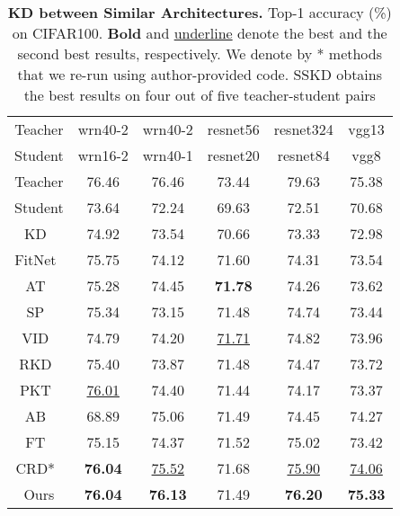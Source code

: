 \documentclass[runningheads]{llncs}
\begin{document}
\begin{table}[t]
    \begin{minipage}{0.30\textwidth}
    \caption{\textbf{KD between Similar Architectures.} Top-1 accuracy (\%) on CIFAR100. \textbf{Bold} and \underline{underline} denote the best and the second best results, respectively. We denote by * methods that we re-run using author-provided code. SSKD obtains the best results on four out of five teacher-student pairs}
    \label{tb1}
    \end{minipage} \hspace{0.01\textwidth}
\begin{minipage}{0.67\textwidth} 
	\begin{tabular}{cccccc}
		\toprule
		Teacher & wrn40-2 & wrn40-2 & resnet56 & resnet324 & vgg13 \\
		Student & wrn16-2 & wrn40-1 & resnet20 & resnet84 & vgg8 \\
		\midrule
		Teacher & 76.46 & 76.46 & 73.44 & 79.63 & 75.38 \\
		Student & 73.64 & 72.24 & 69.63 & 72.51 & 70.68 \\
		\midrule
		KD~\cite{KD} & 74.92 & 73.54 & 70.66 & 73.33 & 72.98 \\
		FitNet~\cite{fitnets} & 75.75 & 74.12 & 71.60 & 74.31 & 73.54 \\
		AT~\cite{AT} & 75.28 & 74.45 & \textbf{71.78} & 74.26 & 73.62 \\
        SP~\cite{simi} & 75.34 & 73.15 & 71.48 & 74.74 & 73.44 \\
        VID~\cite{vid} & 74.79 & 74.20 & \underline{71.71} & 74.82 & 73.96 \\
        RKD~\cite{rkd} & 75.40 & 73.87 & 71.48 & 74.47 & 73.72 \\
        PKT~\cite{pkt} & \underline{76.01} & 74.40 & 71.44 & 74.17 & 73.37 \\
        AB~\cite{AB} & 68.89 & 75.06 & 71.49 & 74.45 & 74.27 \\
        FT~\cite{FT} & 75.15 & 74.37 & 71.52 & 75.02 & 73.42 \\
		CRD*~\cite{crd} & \textbf{76.04} & \underline{75.52} & 71.68 & \underline{75.90} & \underline{74.06} \\
		\midrule
		Ours & \textbf{76.04} & \textbf{76.13} & 71.49 & \textbf{76.20} & \textbf{75.33} \\
		\bottomrule
	\end{tabular}	
    \end{minipage}
\end{table}
\end{document}
